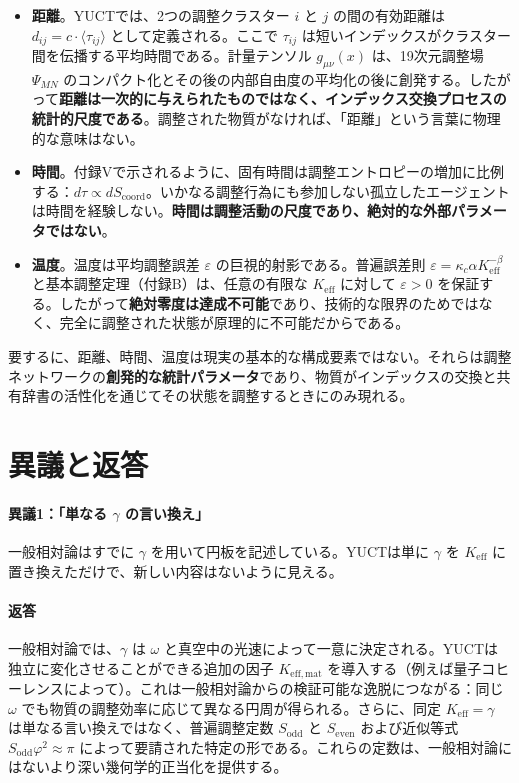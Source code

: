 \documentclass[12pt,a4paper]{article}
\newcommand{\Sodd}{S_{\mathrm{odd}}}
\newcommand{\Seven}{S_{\mathrm{even}}}
\begin{document}
	\begin{itemize}
		\item \textbf{距離}。YUCTでは、2つの調整クラスター \(i\) と \(j\) の間の有効距離は \(d_{ij} = c \cdot \langle \tau_{ij} \rangle\) として定義される。ここで \(\tau_{ij}\) は短いインデックスがクラスター間を伝播する平均時間である。計量テンソル \(g_{\mu\nu}(x)\) は、19次元調整場 \(\Psi_{MN}\) のコンパクト化とその後の内部自由度の平均化の後に創発する。したがって\textbf{距離は一次的に与えられたものではなく、インデックス交換プロセスの統計的尺度である}。調整された物質がなければ、「距離」という言葉に物理的な意味はない。
		
		\item \textbf{時間}。付録Vで示されるように、固有時間は調整エントロピーの増加に比例する：\(d\tau \propto dS_{\mathrm{coord}}\)。いかなる調整行為にも参加しない孤立したエージェントは時間を経験しない。\textbf{時間は調整活動の尺度であり、絶対的な外部パラメータではない}。
		
		\item \textbf{温度}。温度は平均調整誤差 \(\varepsilon\) の巨視的射影である。普遍誤差則 \(\varepsilon = \kappa_c \alpha K_{\mathrm{eff}}^{-\beta}\) と基本調整定理（付録B）は、任意の有限な \(K_{\mathrm{eff}}\) に対して \(\varepsilon > 0\) を保証する。したがって\textbf{絶対零度は達成不可能}であり、技術的な限界のためではなく、完全に調整された状態が原理的に不可能だからである。
	\end{itemize}
	
	要するに、距離、時間、温度は現実の基本的な構成要素ではない。それらは調整ネットワークの\textbf{創発的な統計パラメータ}であり、物質がインデックスの交換と共有辞書の活性化を通じてその状態を調整するときにのみ現れる。
	
	\section{異議と返答}
	\label{sec:objections}
	
	\paragraph{異議1：「単なる \(\gamma\) の言い換え」}
	一般相対論はすでに \(\gamma\) を用いて円板を記述している。YUCTは単に \(\gamma\) を \(K_{\mathrm{eff}}\) に置き換えただけで、新しい内容はないように見える。
	
	\paragraph{返答}
	一般相対論では、\(\gamma\) は \(\omega\) と真空中の光速によって一意に決定される。YUCTは独立に変化させることができる追加の因子 \(K_{\mathrm{eff,mat}}\) を導入する（例えば量子コヒーレンスによって）。これは一般相対論からの検証可能な逸脱につながる：同じ \(\omega\) でも物質の調整効率に応じて異なる円周が得られる。さらに、同定 \(K_{\mathrm{eff}} = \gamma\) は単なる言い換えではなく、普遍調整定数 \(\Sodd\) と \(\Seven\) および近似等式 \(\Sodd \varphi^2 \approx \pi\) によって要請された特定の形である。これらの定数は、一般相対論にはないより深い幾何学的正当化を提供する。
	
\end{document}
